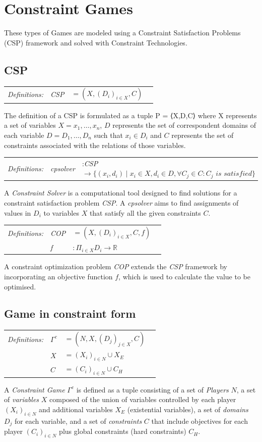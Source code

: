 \documentclass[12pt]{extarticle}
\newcommand{\definition}[1] {
    \begin{tcolorbox}[colback=mygray,colframe=mygray,sharp corners=all,top=0.01cm,bottom=0.01cm,left=0.1cm]
    \small
    \setlength{\tabcolsep}{2pt}
    \begin{tabular}{l l l l}
        \textit{Definitions:} & #1
    \end{tabular}
    \end{tcolorbox}
}
\begin{document}
\section{Constraint Games}

These types of Games are modeled using a Constraint Satisfaction Problems (CSP) framework and solved with Constraint Technologies.

\subsection{CSP}

\definition{\textit{CSP} &$ = (X,(D_i)_{i \in X},C)$}

The definition of a CSP is formulated as a tuple P = ⟨X,D,C⟩ where X represents a set of variables $X = {x_1,\ldots, x_n}$, $D$ represents the set of correspondent domains of each variable $D = {D_1,\ldots,D_n}$ such that $x_i \in D_i$ and $C$ represents the set of constraints associated with the relations of those variables.

\definition{\textit{cpsolver} &:\textit{CSP} $ \rightarrow \{(x_i,d_i)\mid x_i \in X, d_i \in D, \forall C_j \in C : C_j \textit{ is satisfied}\}$}

A \textit{Constraint Solver} is a computational tool designed to find solutions for a constraint satisfaction problem \textit{CSP}.  A \textit{cpsolver} aims to find assignments of values in $D_i$ to variables $X$ that satisfy all the given constraints $C$. 

\definition{
    \textit{COP} &$ = (X,(D_i)_{i \in X},C,f)$
    \\ & \textit{f} &$:\Pi_{i \in X}D_i \rightarrow \mathbb{R}$
}

A constraint optimization problem \textit{COP} extends the \textit{CSP} framework by incorporating an objective function $f$, which is used to calculate the value to be optimised.


\subsection{Game in constraint form}

\definition{
    $\Gamma^c$ &$= (N,X,(D_j)_{j \in X}, C) $
    \\ & $X $&$ = (X_i)_{i \in N} \cup X_{E} $
    \\ & $C $&$ = (C_i)_{i \in N} \cup C_{H} $
}

A \textit{Constraint Game} $\Gamma^c$ is defined as a tuple consisting of a set of \textit{Players} $N$, a set of \textit{variables} $X$ composed of the union of variables controlled by each player $(X_i)_{i \in N}$ and additional variables $X_E$ (existential variables), a set of \textit{domains} $D_j$ for each variable, and a set of \textit{constraints} $C$ that include objectives for each player $(C_i)_{i \in N}$ plus global constraints (hard constraints) $C_H$.
\end{document}
